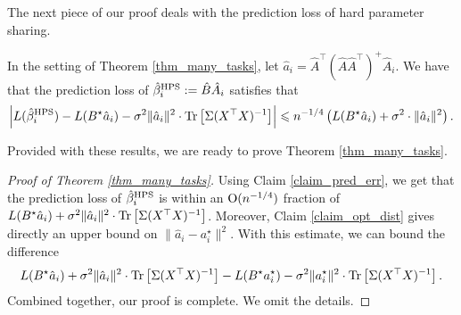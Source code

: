 	The next piece of our proof deals with the prediction loss of hard parameter sharing.
	\begin{claim}\label{claim_pred_err}
		In the setting of Theorem \ref{thm_many_tasks},
		let $\hat{a}_i = \hat{A}^{\top} (\hat{A}\hat{A}^{\top})^{+} \hat{A}_i$.
		We have that the prediction loss of $\hat{\beta}_i^{\textup{HPS}} := \hat{B} \hat{A}_i$ satisfies that
		\begin{align*}
			{\left| {L(\hat{\beta}_i^{\textup{HPS}}) - L(B^{\star} \hat{a}_i) - \sigma^2 \|\hat{a}_i\|^2 \cdot \operatorname{Tr}\left[\Sigma (X^{\top}X)^{-1}\right]} \right|}
			\leqslant  n^{-1/4} \left( L(B^{\star} \hat{a}_i)+ \sigma^2  \cdot\|\hat a_i\|^2\right) .
		\end{align*}
	\end{claim}
	Provided with these results, we are ready to prove Theorem \ref{thm_many_tasks}.
	\begin{proof}[Proof of Theorem \ref{thm_many_tasks}]
		Using Claim \ref{claim_pred_err}, we get that the prediction loss of $\hat{\beta}_i^{\textup{HPS}}$ is within an $\operatorname{O}(n^{-1/4})$ fraction of $L(B^{\star}\hat{a}_i)+\sigma^2\|\hat{a}_i\|^2\cdot \operatorname{Tr}\left[\Sigma(X^{\top}X)^{-1}\right]$. Moreover, Claim \ref{claim_opt_dist} gives directly an upper bound on $\|\hat a_i - a_i^\star\|^2$. With this estimate, we can bound the difference
		$$L(B^{\star}\hat{a}_i)+\sigma^2\|\hat{a}_i\|^2\cdot \operatorname{Tr}\left[\Sigma(X^{\top}X)^{-1}\right] - L(B^{\star} {a}^\star_i)-\sigma^2\|{a}^\star_i\|^2\cdot \operatorname{Tr}\left[\Sigma(X^{\top}X)^{-1}\right].$$
		Combined together, our proof is complete. We omit the details.
	\end{proof}
	
